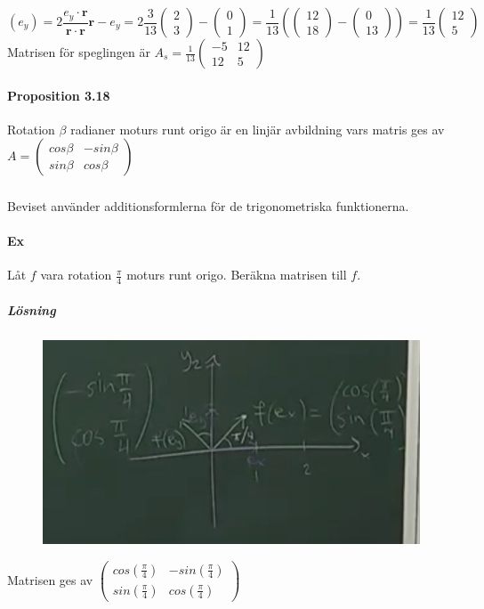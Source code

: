 \begin{equation*}
    (e_{y})=2\frac{e_{y}\cdot \bm{r}}{\bm{r}\cdot \bm{r}}\bm{r} - e_{y}=2\frac{3}{13}\begin{pmatrix}2\\3\end{pmatrix}-\begin{pmatrix}0\\1\end{pmatrix}=
    \frac{1}{13}(\begin{pmatrix}12\\18\end{pmatrix}-\begin{pmatrix}0\\13\end{pmatrix})=\frac{1}{13}\begin{pmatrix}12\\5\end{pmatrix}
\end{equation*}
Matrisen för speglingen är $A_{s}=\frac{1}{13}\begin{pmatrix}-5&12\\12&5\end{pmatrix}$

\paragraph{Proposition 3.18} Rotation $\beta$ radianer moturs runt origo är en linjär avbildning vars matris ges av
$A=\begin{pmatrix}
    cos\beta & -sin\beta\\sin\beta & cos\beta
\end{pmatrix}$
\subparagraph{} Beviset använder additionsformlerna för de trigonometriska funktionerna.

\paragraph{Ex} Låt $f$ vara rotation $\frac{\pi}{4}$ moturs runt origo.
Beräkna matrisen till $f$.
\subparagraph{Lösning} 
\begin{figure}[h]
    \includegraphics[scale=0.3]{imgs/img04.png}
\end{figure}
Matrisen ges av $\begin{pmatrix}
    cos(\frac{\pi}{4}) & -sin(\frac{\pi}{4})\\sin(\frac{\pi}{4}) & cos(\frac{\pi}{4})
\end{pmatrix}$

